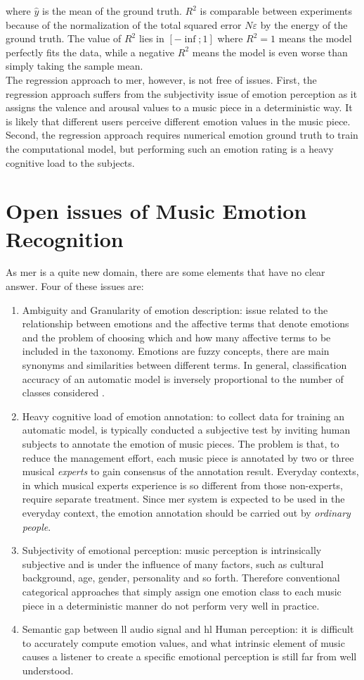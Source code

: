 where $\widehat{y}$ is the mean of the ground truth. $R^2$ is comparable between experiments because of the normalization of the total squared error $N\varepsilon$ by the energy of the ground truth. The value of $R^2$  lies in $[-\inf;1]$ where $R^2=1$ means the model perfectly fits the data, while a negative $R^2$ means the model is even worse than simply taking the sample mean.
\\ \indent
The regression approach to \gls{mer}, however, is not free of issues. First, the regression approach suffers from the subjectivity issue of emotion perception as it assigns the valence and arousal values to a music piece in a deterministic way. It is likely that different users perceive different emotion values in the music piece. Second, the regression approach requires numerical emotion ground truth to train the computational model, but performing such an emotion rating is a heavy cognitive load to the subjects.

\section{Open issues of Music Emotion Recognition} \label{issues}
As \gls{mer}  is a quite new domain, there are some elements that have no clear answer. Four of these issues are:
\begin{enumerate}
	\item Ambiguity and Granularity of emotion description: issue related to the relationship between emotions and the affective terms that denote emotions and the problem of choosing which and how many affective terms to be included in the taxonomy. Emotions are fuzzy concepts, there are main synonyms and similarities between different terms. In general, classification accuracy of an automatic model is inversely proportional to the number of classes considered \cite{van2006emotion}.
	\item Heavy cognitive load of emotion annotation: to collect data for training an automatic model, is typically conducted a subjective test by inviting human subjects to annotate the emotion of music pieces. The problem is that, to reduce the management effort, each music piece is annotated by two or three musical \textit{experts} to gain consensus of the annotation result. Everyday contexts, in which musical experts experience is so different from those non-experts, require separate treatment. Since \gls{mer} system is expected to be used in the everyday context, the emotion annotation should be carried out by \textit{ordinary people}.
	\item Subjectivity of emotional perception: music perception is intrinsically subjective and is under the influence of many factors, such as cultural background, age, gender, personality and so forth. Therefore conventional categorical approaches that simply assign one emotion class to each music piece in a deterministic manner do not perform very well in practice.
	\item Semantic gap between \gls{ll} audio signal and \gls{hl} Human perception: it is difficult to accurately compute emotion values, and what intrinsic element of music causes a listener to create a specific emotional perception is still far from well understood.
\end{enumerate}
